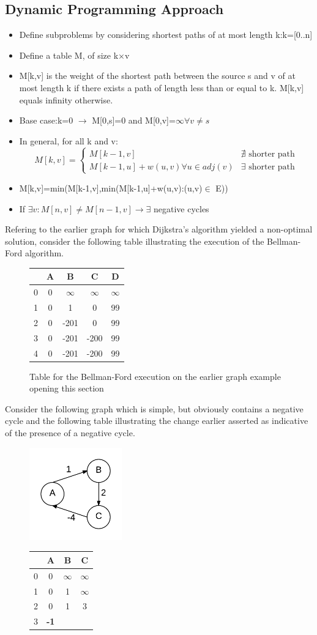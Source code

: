 \documentclass[12pt,letterpaper]{article}
\begin{document}
\subsection{Dynamic Programming Approach}
\begin{itemize}
\item Define subproblems by considering shortest paths of at most length k:k=[0..n]
\item Define a table M, of size k$\times$v
\item M[k,v] is the weight of the shortest path between the source s and v of at most length k if there exists a path of length less than or equal to k. M[k,v] equals infinity otherwise. 
\item Base case:k=0 $\to$ M[0,s]=0 and M[0,v]=$\infty\forall v\neq s$
\item In general, for all k and v:
\[M[k,v]=\begin{cases}M[k-1,v] & \nexists\text{ shorter path}\\ M[k-1,u]+w(u,v)\forall u \in adj(v)& \exists\text{ shorter path}\end{cases}\]
\item M[k,v]=min(M[k-1,v],min(M[k-1,u]+w(u,v):(u,v)$\in$ E))
\item If $\exists v: M[n,v]\neq M[n-1,v]\to \exists$ negative cycles
\end{itemize}
Refering to the earlier graph for which Dijkstra's algorithm yielded a non-optimal solution, consider the following table illustrating the execution of the Bellman-Ford algorithm.
\begin{figure}
\centering
\begin{tabular}{|c|c|c|c|c|}
\hline
 &A&B&C&D\\ \hline \hline
0&0&$\infty$&$\infty$&$\infty$\\ \hline
1&0&1&0&99\\ \hline
2&0&-201&0&99\\ \hline
3&0&-201&-200&99\\ \hline
4&0&-201&-200&99\\ \hline
\end{tabular}
\caption{Table for the Bellman-Ford execution on the earlier graph example opening this section}
\end{figure}
Consider the following graph which is simple, but obviously contains a negative cycle and the following table illustrating the change earlier asserted as indicative of the presence of a negative cycle. 
\begin{figure}[h]
\centering
\includegraphics[width=4cm]{negcycleex}
\begin{tabular}{|c|c|c|c|}
\hline
 &A&B&C \\ \hline \hline
0&0&$\infty$&$\infty$\\ \hline
1&0&1&$\infty$\\ \hline
2&0&1&3\\ \hline
3&\textbf{-1}& & \\ \hline
\end{tabular}
\end{figure}
\end{document}
